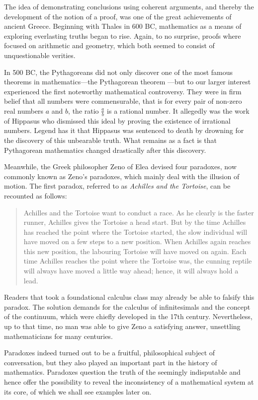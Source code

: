 \documentclass{article}
\def\righttriangle{
\scalebox{0.7}{
\begin{picture}(5,0)
\hspace{-0.2em}
\put(0,0){\line(1,0){10}}
\put(10,0){\line(-1,1){10}}
\put(0,0){\line(0,1){10}}
\end{picture}
}
\hspace{-0.8em}
}
\begin{document}
The idea of demonstrating conclusions using coherent arguments, and thereby the development of the notion of a proof, was one of the great achievements of ancient Greece.
Beginning with Thales in 600 BC, mathematics as a means of exploring everlasting truths began to rise. Again, to no surprise, proofs where focused on arithmetic and geometry, which both seemed to consist of unquestionable verities.

In 500 BC, the Pythagoreans did not only discover one of the most famous theorems in mathematics---the Pythagorean theorem\righttriangle---but to our larger interest experienced the first noteworthy mathematical controversy. They were in firm belief that all numbers were commensurable, that is for every pair of non-zero real numbers $a$ and $b$, the ratio $\frac{a}{b}$ is a rational number. It allegedly was the work of Hippasus who dismissed this ideal by proving the existence of irrational numbers. Legend has it that Hippasus was sentenced to death by drowning for the discovery of this unbearable truth. What remains as a fact is that Pythagorean mathematics changed drastically after this discovery.

Meanwhile, the Greek philosopher Zeno of Elea devised four paradoxes, now commonly known as Zeno's paradoxes, which mainly deal with the illusion of motion. The first paradox, referred to as \textit{Achilles and the Tortoise}, can be recounted as follows:
\begin{quote}\label{zeno_paradox}
Achilles and the Tortoise want to conduct a race. As he clearly is the faster runner, Achilles gives the Tortoise a head start. But by the time Achilles has reached the point where the Tortoise started, the slow individual will have moved on a few steps to a new position. When Achilles again reaches this new position, the labouring Tortoise will have moved on again. Each time Achilles reaches the point where the Tortoise was, the cunning reptile will always have moved a little way ahead; hence, it will always hold a lead.\cite[Aristotle, {\textit{Physics} VI:9, 239b15}]{physics}
\end{quote}
Readers that took a foundational calculus class may already be able to falsify this paradox. The solution demands for the calculus of infinitesimals and the concept of the continuum, which were chiefly developed in the 17th century. Nevertheless, up to that time, no man was able to give Zeno a satisfying answer, unsettling mathematicians for many centuries.

Paradoxes indeed turned out to be a fruitful, philosophical subject of conversation, but they also played an important part in the history of mathematics. Paradoxes question the truth of the seemingly indisputable and hence offer the possibility to reveal the inconsistency of a mathematical system at its core, of which we shall see examples later on.
\end{document}

